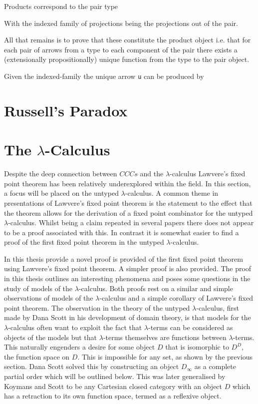 Products correspond to the pair type


With the indexed family of projections being the projections out of the pair.


All that remains is to prove that these constitute the product object i.e. that
for each pair of arrows from a type to each component of the pair there exists a
(extensionally propositionally) unique function from the type to the pair object.


Given the indexed-family the unique arrow \verb|u| can be produced by  


\section{Russell's Paradox}

\section{The $\lambda$-Calculus}

Despite the deep connection between $CCCs$ and the $\lambda$-calculus 
Lawvere's fixed point theorem has been relatively underexplored within the
field. In this section, a focus will be placed on the untyped
$\lambda$-calculus. A common theme in presentations of Lawvere's fixed point
theorem is the statement to the effect that the theorem allows for the
derivation of a fixed point combinator for the untyped $\lambda$-calculus.
Whilst being a claim repeated in several papers there does not appear to be a
proof associated with this. In contrast it is somewhat easier to find a proof
of the first fixed point theorem in the untyped $\lambda$-calculus. 

In this thesis provide a novel proof is provided of the first fixed point
theorem using Lawvere's fixed point theorem. A simpler proof is also provided.
The proof in this thesis outlines an interesting phenomena and poses some
questions in the study of models of the $\lambda$-calculus. Both proofs rest on
a similar and simple observations of models of the $\lambda$-calculus and a
simple corollary of Lawvere's fixed point theorem. The observation in the
theory of the untyped $\lambda$-calculus, first made by Dana Scott in his
development of domain theory, is that models for the $\lambda$-calculus often
want to exploit the fact that $\lambda$-terms can be considered as objects of
the models but that $\lambda$-terms themselves are functions between
$\lambda$-terms. This naturally engenders a desire for some object $D$ that is
isomorphic to $D^D$, the function space on $D$. This is impossible for any set,
as shown by the previous section. Dana Scott solved this by constructing an
object $D_{\infty}$ as a complete partial order which will be outlined below.
This was later generalised by Koymans and Scott to be any Cartesian closed
category with an object $D$ which has a retraction to its own function space,
termed as a reflexive object.

